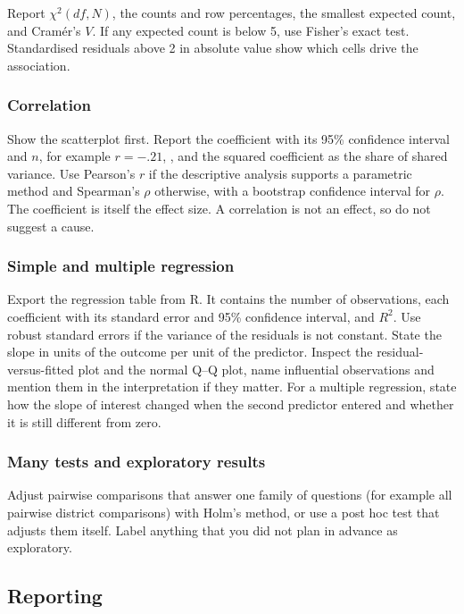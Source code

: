 \documentclass[11pt,a4paper]{article}
\begin{document}
Report $\chi^2(df,N)$, the counts and row percentages, the smallest expected count, and Cram\'er's $V$. If any expected count is below 5, use Fisher's exact test. Standardised residuals above 2 in absolute value show which cells drive the association.

\subsubsection*{Correlation}

Show the scatterplot first. Report the coefficient with its 95\% confidence interval and $n$, for example $r=-.21$, , and the squared coefficient as the share of shared variance. Use Pearson's $r$ if the descriptive analysis supports a parametric method and Spearman's $\rho$ otherwise, with a bootstrap confidence interval for $\rho$. The coefficient is itself the effect size. A correlation is not an effect, so do not suggest a cause.

\subsubsection*{Simple and multiple regression}

Export the regression table from R. It contains the number of observations, each coefficient with its standard error and 95\% confidence interval, and $R^2$. Use robust standard errors if the variance of the residuals is not constant. State the slope in units of the outcome per unit of the predictor. Inspect the residual-versus-fitted plot and the normal Q--Q plot, name influential observations and mention them in the interpretation if they matter. For a multiple regression, state how the slope of interest changed when the second predictor entered and whether it is still different from zero.

\subsubsection*{Many tests and exploratory results}

Adjust pairwise comparisons that answer one family of questions (for example all pairwise district comparisons) with Holm's method, or use a post hoc test that adjusts them itself. Label anything that you did not plan in advance as exploratory.

\subsection{Reporting}\label{sec:chk-reporting}
\end{document}
